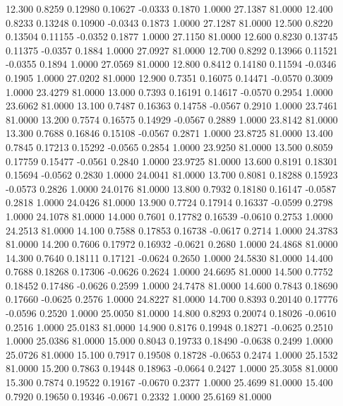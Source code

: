   12.300   0.8259   0.12980   0.10627  -0.0333   0.1870   1.0000  27.1387  81.0000
  12.400   0.8233   0.13248   0.10900  -0.0343   0.1873   1.0000  27.1287  81.0000
  12.500   0.8220   0.13504   0.11155  -0.0352   0.1877   1.0000  27.1150  81.0000
  12.600   0.8230   0.13745   0.11375  -0.0357   0.1884   1.0000  27.0927  81.0000
  12.700   0.8292   0.13966   0.11521  -0.0355   0.1894   1.0000  27.0569  81.0000
  12.800   0.8412   0.14180   0.11594  -0.0346   0.1905   1.0000  27.0202  81.0000
  12.900   0.7351   0.16075   0.14471  -0.0570   0.3009   1.0000  23.4279  81.0000
  13.000   0.7393   0.16191   0.14617  -0.0570   0.2954   1.0000  23.6062  81.0000
  13.100   0.7487   0.16363   0.14758  -0.0567   0.2910   1.0000  23.7461  81.0000
  13.200   0.7574   0.16575   0.14929  -0.0567   0.2889   1.0000  23.8142  81.0000
  13.300   0.7688   0.16846   0.15108  -0.0567   0.2871   1.0000  23.8725  81.0000
  13.400   0.7845   0.17213   0.15292  -0.0565   0.2854   1.0000  23.9250  81.0000
  13.500   0.8059   0.17759   0.15477  -0.0561   0.2840   1.0000  23.9725  81.0000
  13.600   0.8191   0.18301   0.15694  -0.0562   0.2830   1.0000  24.0041  81.0000
  13.700   0.8081   0.18288   0.15923  -0.0573   0.2826   1.0000  24.0176  81.0000
  13.800   0.7932   0.18180   0.16147  -0.0587   0.2818   1.0000  24.0426  81.0000
  13.900   0.7724   0.17914   0.16337  -0.0599   0.2798   1.0000  24.1078  81.0000
  14.000   0.7601   0.17782   0.16539  -0.0610   0.2753   1.0000  24.2513  81.0000
  14.100   0.7588   0.17853   0.16738  -0.0617   0.2714   1.0000  24.3783  81.0000
  14.200   0.7606   0.17972   0.16932  -0.0621   0.2680   1.0000  24.4868  81.0000
  14.300   0.7640   0.18111   0.17121  -0.0624   0.2650   1.0000  24.5830  81.0000
  14.400   0.7688   0.18268   0.17306  -0.0626   0.2624   1.0000  24.6695  81.0000
  14.500   0.7752   0.18452   0.17486  -0.0626   0.2599   1.0000  24.7478  81.0000
  14.600   0.7843   0.18690   0.17660  -0.0625   0.2576   1.0000  24.8227  81.0000
  14.700   0.8393   0.20140   0.17776  -0.0596   0.2520   1.0000  25.0050  81.0000
  14.800   0.8293   0.20074   0.18026  -0.0610   0.2516   1.0000  25.0183  81.0000
  14.900   0.8176   0.19948   0.18271  -0.0625   0.2510   1.0000  25.0386  81.0000
  15.000   0.8043   0.19733   0.18490  -0.0638   0.2499   1.0000  25.0726  81.0000
  15.100   0.7917   0.19508   0.18728  -0.0653   0.2474   1.0000  25.1532  81.0000
  15.200   0.7863   0.19448   0.18963  -0.0664   0.2427   1.0000  25.3058  81.0000
  15.300   0.7874   0.19522   0.19167  -0.0670   0.2377   1.0000  25.4699  81.0000
  15.400   0.7920   0.19650   0.19346  -0.0671   0.2332   1.0000  25.6169  81.0000

